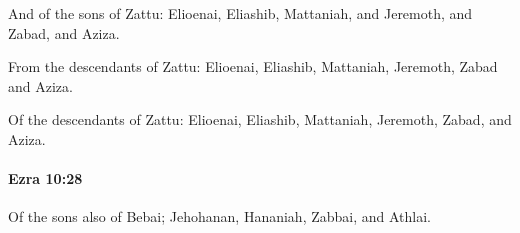 			\begin{versebox}
					\item[BHS] 
					\item[LXX] 
					\item[ASV] And of the sons of Zattu: Elioenai, Eliashib, Mattaniah, and Jeremoth, and Zabad, and Aziza.
					\item[NIV] From the descendants of Zattu: Elioenai, Eliashib, Mattaniah, Jeremoth, Zabad and Aziza.
					\item[NRSV] Of the descendants of Zattu: Elioenai, Eliashib, Mattaniah, Jeremoth, Zabad, and Aziza.
			\end{versebox}

		\paragraph{Ezra 10:28} %
			\label{EZRA-10-28}

			Of the sons also of Bebai; Jehohanan, Hananiah, Zabbai, and Athlai.

